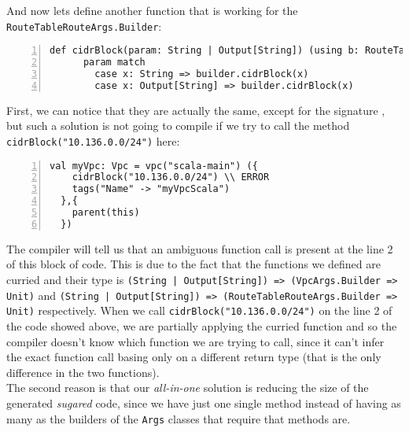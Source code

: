 And now lets define another function that is working for the \texttt{RouteTableRouteArgs.Builder}:\\
\begin{minipage}{\linewidth}
\begin{lstlisting}[numbers=left, numberstyle=\tiny, numbersep=-5pt, stepnumber=1, linewidth=420pt]
  def cidrBlock(param: String | Output[String]) (using b: RouteTableRouteArgs.Builder): Unit =
      param match
        case x: String => builder.cidrBlock(x)
        case x: Output[String] => builder.cidrBlock(x)
\end{lstlisting}
\end{minipage}
First, we can notice that they are actually the same, except for the signature , but such a solution is not going to compile if we try to call the method \texttt{cidrBlock("10.136.0.0/24")} here:\\
\begin{minipage}{\linewidth}
\begin{lstlisting}[numbers=left, numberstyle=\tiny, numbersep=-5pt, stepnumber=1, linewidth=420pt]
  val myVpc: Vpc = vpc("scala-main") ({
    cidrBlock("10.136.0.0/24") \\ ERROR
    tags("Name" -> "myVpcScala")
  },{
    parent(this)
  })
\end{lstlisting}
\end{minipage}
The compiler will tell us that an ambiguous function call is present at the line 2 of this block of code.
This is due to the fact that the functions we defined are curried and their type is \texttt{(String | Output[String]) => (VpcArgs.Builder => Unit)} and \texttt{(String | Output[String]) => (RouteTableRouteArgs.Builder => Unit)} respectively.
When we call \texttt{cidrBlock("10.136.0.0/24")} on the line 2 of the code showed above, we are partially applying the curried function and so the compiler doesn't know which function we are trying to call, since it can't infer the exact function call basing only on a different return type (that is the only difference in the two functions).\\
The second reason is that our \textit{all-in-one} solution is reducing the size of the generated \textit{sugared} code, since we have just one single method instead of having as many as the builders of the \texttt{Args} classes that require that methods are.\\

